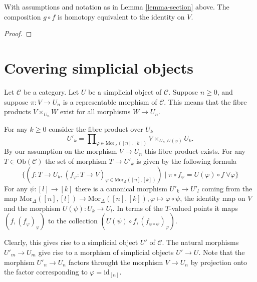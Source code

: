 \begin{lemma}
\label{lemma-equiv}
With assumptions and notation as in Lemma \ref{lemma-section}
above. The composition $g \circ f$ is homotopy equivalent
to the identity on $V$.
\end{lemma}

\begin{proof}


\end{proof}















\section{Covering simplicial objects}
\label{section-making-simplicial}

\noindent
Let $\mathcal{C}$ be a category.
Let $U$ be a simplicial object of $\mathcal{C}$.
Suppose $n\geq 0$, and suppose $\pi : V \to U_n$ is
a representable morphism of $\mathcal{C}$. This
means that the fibre products $V \times_{U_n} W$
exist for all morphisms $W \to U_n$.

\medskip\noindent
For any $k \geq 0$ consider the fibre product over $U_k$
$$
U'_k = \prod\nolimits_{\varphi \in \text{Mor}_\Delta([n],[k])}
V\times_{U_n, U(\varphi)} U_k.
$$
By our assumption on the morphism $V \to U_n$ this fibre product
exists. For any $T \in \text{Ob}(\mathcal{C})$ the set of morphism
$T \to U'_k$ is given by the following formula
$$ 
\{
(f : T \to U_k, (f_\varphi : T \to V)_{\varphi \in \text{Mor}_\Delta([n],[k])})
\mid
\pi \circ f_{\varphi} = U(\varphi) \circ f\ \forall \varphi
\}
$$
For any $\psi : [l] \to [k]$ there is a canonical morphism
$U'_k \to U'_l$ coming from the map $\text{Mor}_\Delta([n],[l])
\to \text{Mor}_\Delta([n],[k]), \varphi \mapsto \varphi \circ \psi$,
the identity map on $V$ and the morphism
$U(\psi) : U_k \to U_l$. In terms of the $T$-valued points
it maps $(f, (f_\varphi)_\varphi)$ to the collection
$(U(\psi) \circ f, (f_{\varphi \circ \psi})_{\varphi})$.

\medskip\noindent
Clearly, this gives rise to a simplicial object $U'$ of
$\mathcal{C}$. The natural morphisms $U'_m \to U_m$ give rise to a
morphism of simplicial objects $U' \to U$. Note that
the morphism $U'_n \to U_n$ factors throught the morphism $V \to U_n$
by projection onto the factor corresponding to $\varphi=\text{id}_{[n]}$.

